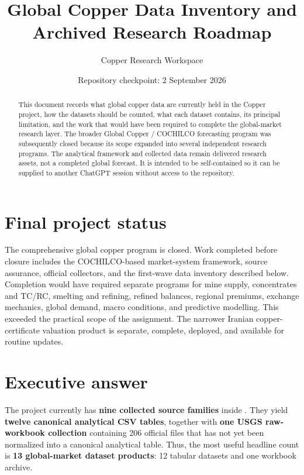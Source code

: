 \documentclass[11pt,a4paper]{article}
\title{Global Copper Data Inventory and Archived Research Roadmap}
\author{Copper Research Workspace}
\date{Repository checkpoint: 2 September 2026}
\newcommand{\code}[1]{\texttt{\detokenize{#1}}}
\begin{document}
\maketitle

\begin{abstract}
This document records what global copper data are currently held in the Copper project, how the
datasets should be counted, what each dataset contains, its principal limitation, and the work
that would have been required to complete the global-market research layer. The broader Global
Copper / COCHILCO forecasting program was subsequently closed because its scope expanded into
several independent research programs. The analytical framework and collected data remain
delivered research assets, not a completed global forecast. It is intended to be self-contained so it
can be supplied to another ChatGPT session without access to the repository.
\end{abstract}

\section{Final project status}

The comprehensive global copper program is closed. Work completed before closure includes the
COCHILCO-based market-system framework, source assurance, official collectors, and the first-wave
data inventory described below. Completion would have required separate programs for mine supply,
concentrates and TC/RC, smelting and refining, refined balances, regional premiums, exchange
mechanics, global demand, macro conditions, and predictive modelling. This exceeded the practical
scope of the assignment. The narrower Iranian copper-certificate valuation product is separate,
complete, deployed, and available for routine updates.

\section{Executive answer}

The project currently has \textbf{nine collected source families} inside
\code{commodity/copper/data/raw/global_market}. They yield \textbf{twelve canonical analytical
CSV tables}, together with \textbf{one USGS raw-workbook collection} containing 206 official
files that has not yet been normalized into a canonical analytical table. Thus, the most useful
headline count is \textbf{13 global-market dataset products}: 12 tabular datasets and one
workbook archive.
\end{document}
